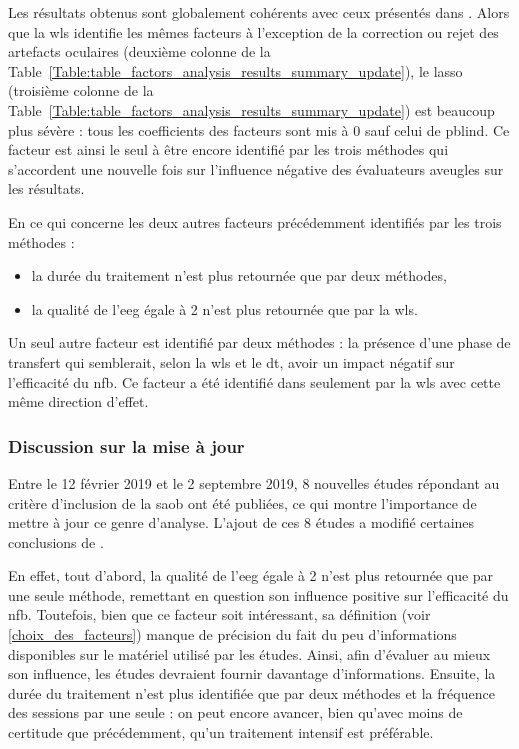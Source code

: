 Les résultats obtenus sont globalement cohérents avec ceux présentés dans \citet{Bussalb2019a}. Alors que la \gls{wls} identifie les mêmes facteurs à l'exception de la correction ou rejet 
des artefacts oculaires (deuxième colonne de la Table~\ref{Table:table_factors_analysis_results_summary_update}), le \gls{lasso} (troisième colonne de la 
Table~\ref{Table:table_factors_analysis_results_summary_update}) est beaucoup plus sévère : tous les coefficients des facteurs sont mis à 0 sauf celui de \gls{pblind}. Ce facteur est ainsi 
le seul à être encore identifié par les trois méthodes qui s'accordent une nouvelle fois sur l'influence négative des évaluateurs aveugles sur les résultats.  

En ce qui concerne les deux autres facteurs précédemment identifiés par les trois méthodes : 
\begin{itemize}
\item la durée du traitement n'est plus retournée que par deux méthodes, 
\item la qualité de l'\gls{eeg} égale à 2 n'est plus retournée que par la \gls{wls}. 
\end{itemize}

Un seul autre facteur est identifié par deux méthodes : la présence d'une phase de transfert qui semblerait, selon la \gls{wls} et le \gls{dt}, avoir un impact négatif sur l'efficacité 
du \gls{nfb}. Ce facteur a été identifié dans \citet{Bussalb2019a} seulement par la \gls{wls} avec cette même direction d'effet.

\subsubsection{Discussion sur la mise à jour}

Entre le 12 février 2019 et le 2 septembre 2019, 8 nouvelles études répondant au critère d'inclusion de la \gls{saob} ont été publiées, ce qui montre l'importance de mettre à jour ce 
genre d'analyse. L'ajout de ces 8 études a modifié certaines conclusions de \citet{Bussalb2019a}. 

En effet, tout d'abord, la qualité de l'\gls{eeg} égale à 2 n'est plus retournée que par une seule méthode,
remettant en question son influence positive sur l'efficacité du \gls{nfb}. Toutefois, bien que ce facteur soit intéressant, sa définition (voir \ref{choix_des_facteurs}) manque de précision 
du fait du peu d'informations disponibles sur le matériel utilisé par les études. Ainsi, afin d'évaluer au mieux son influence, les études devraient fournir davantage d'informations. Ensuite, 
la durée du traitement n'est plus identifiée que par deux méthodes et la fréquence des sessions par une seule : on peut encore avancer, bien qu'avec moins de certitude que précédemment, 
qu'un traitement intensif est préférable. 

